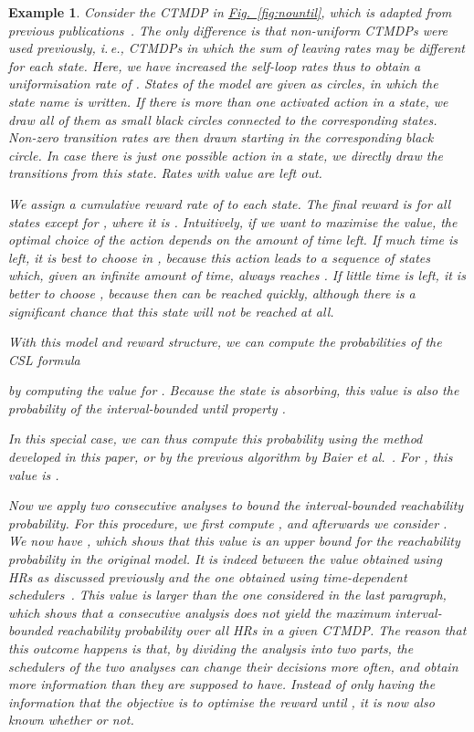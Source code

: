 \documentclass[10pt,twocolumn]{article}
\newtheorem{example}{Example}
\newcommand{\reffig}[1]{\texorpdfstring{\hyperref[fig:#1]{Fig.~\ref*{fig:#1}}}{Fig.~\ref*{fig:#1}}}
\begin{document}
\begin{example}
Consider the CTMDP  in \reffig{nountil}, which is adapted
from previous publications~\cite{ZhangN10,BuchholzHHZ11}.
The only difference is that non-uniform CTMDPs were used previously,
i.\,e., CTMDPs in which the sum of leaving rates may be different for each state.
Here, we have increased the self-loop rates thus to obtain a uniformisation rate of .
States of the model are given as circles, in which the state name is written.
If there is more than one activated action in a state, we draw all of them as small black circles connected to the corresponding states.
Non-zero transition rates are then drawn starting in the corresponding black circle.
In case there is just one possible action in a state, we directly draw the transitions from this state.
Rates with value  are left out.

We assign a cumulative reward rate of  to each state.
The final reward is  for all states except for , where it is .
Intuitively, if we want to maximise the value, the optimal choice of the action depends on the amount of time left.
If much time is left, it is best to choose  in , because this action leads to a sequence of states which, given an infinite amount of time, always reaches .
If little time is left, it is better to choose , because then  can be reached quickly, although there is a significant chance that this state will not be reached at all.

With this model and reward structure, we can compute the probabilities of the CSL formula

by computing the value for .
Because the state  is absorbing, this value is also the probability of the interval-bounded until property
.

In this special case, we can thus compute this probability using the method developed in this paper, or by the previous algorithm by Baier et al.~\cite{BaierHKH05}.
For , this value is .

Now we apply two consecutive analyses to bound the interval-bounded reachability probability.
For this procedure, we first compute ,
and afterwards we consider .
We now have , which shows that this value is an upper bound for the reachability probability in the original model.
It is indeed between the value obtained using HRs as discussed previously and the one obtained using time-dependent schedulers~\cite{ZhangN10,BuchholzHHZ11}. 
This value is larger than the one considered in the last paragraph, which shows that a consecutive analysis does not yield the maximum interval-bounded reachability probability over all HRs in a given CTMDP.
The reason that this outcome happens is that, by dividing the analysis into two parts, the schedulers of the two analyses can change their decisions more often,
and obtain more information than they are supposed to have.
Instead of only having the information that the objective is to
optimise the reward until , it is now also known whether
 or not.
\end{example}
\end{document}
